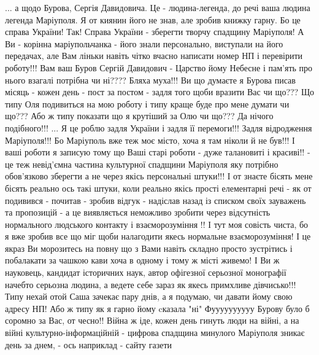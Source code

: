  
 
 
 
 

... а щодо Бурова, Сергія Давидовича. Це - людина-легенда, до речі ваша людина
легенда Маріуполя.  Я от киянин його не знав, але зробив книжку гарну. Бо це
справа України! Так! Справа України - зберегти творчу спадщину Маріуполя!  А Ви
- корінна маріупольчанка - його знали персонально, виступали на його передачах,
але Вам ліньки навіть чітко вчасно написати номер НП і перевірити роботу!!!  Вам
ваш Буров Сергій Давидович - Царство йому Небесне і пам'ять про нього взагалі
потрібна чи ні????  Бляха муха!!! Ви що думаєте я Бурова писав місяць - кожен
день - пост за постом - задля того щоби вразити Вас чи що???  Що типу Оля
подивиться на мою роботу і типу краще буде про мене думати чи що???  Або ж типу
показати що я крутіший за Олю чи що???  Да нічого подібного!!! ... Я це роблю
задля України і задля її перемоги!!! Задля відродження Маріуполя!!! Бо
Маріуполь вже теж моє місто, хоча я там ніколи й не був!!! І ваші роботи я
записую тому що Ваші старі роботи - дуже талановиті і красиві!! - це теж
невід'ємна частина культурної спадщини Маріуполя яку потрібно обов'язково
зберегти а не через якісь персональні штуки!!! І от знаєте бісять мене бісять
реально ось такі штуки, коли реально якісь прості елементарні  речі - як от
подивився - почитав - зробив відгук - надіслав назад із списком своїх зауважень
та пропозицій - а це виявляється неможливо зробити через відсутність
нормального людського контакту і взаєморозуміння !! І тут моя совість чиста, бо
я вже зробив все що міг щоби налагодити якесь нормальне взаєморозуміння!  І це
якраз Ви морозитесь на повну що з Вами навіть складно просто зустрітись і
побалакати за чашкою кави хоча в одному і тому ж місті живемо! І Ви ж
науковець, кандидат історичних наук, автор
офігезної серьозної монографії начебто серьозна людина, а ведете себе зараз як
якесь примхливе дівчисько!!! Типу нехай отой Саша зачекає пару днів, а я
подумаю, чи давати йому свою адресу НП! Або ж типу як я гарно йому cказала "ні"
Фуууууууууу Бурову було б соромно за Вас, от чесно!!  Війна ж іде, кожен день
гинуть люди на війні, а на війні культурно-інформаційній - цифрова спадщина
минулого Маріуполя зникає день за днем, - ось наприклад - сайту газети
